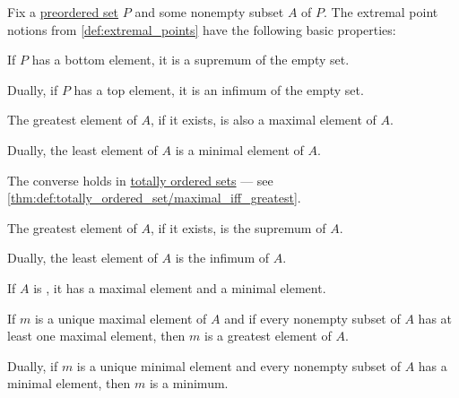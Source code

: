 \begin{proposition}\label{thm:def:extremal_points}
  Fix a \hyperref[def:preordered_set]{preordered set} \( P \) and some nonempty subset \( A \) of \( P \). The extremal point notions from \cref{def:extremal_points} have the following basic properties:
  \begin{thmenum}
     If \( P \) has a bottom element, it is a supremum of the empty set.

    Dually, if \( P \) has a top element, it is an infimum of the empty set.

     The greatest element of \( A \), if it exists, is also a maximal element of \( A \).

    Dually, the least element of \( A \) is a minimal element of \( A \).

    The converse holds in \hyperref[def:totally_ordered_set]{totally ordered sets} --- see \cref{thm:def:totally_ordered_set/maximal_iff_greatest}.

     The greatest element of \( A \), if it exists, is the supremum of \( A \).

    Dually, the least element of \( A \) is the infimum of \( A \).

     If \( A \) is , it has a maximal element and a minimal element.

     If \( m \) is a unique maximal element of \( A \) and if every nonempty subset of \( A \) has at least one maximal element, then \( m \) is a greatest element of \( A \).

    Dually, if \( m \) is a unique minimal element and every nonempty subset of \( A \) has a minimal element, then \( m \) is a minimum.
  \end{thmenum}
\end{proposition}
